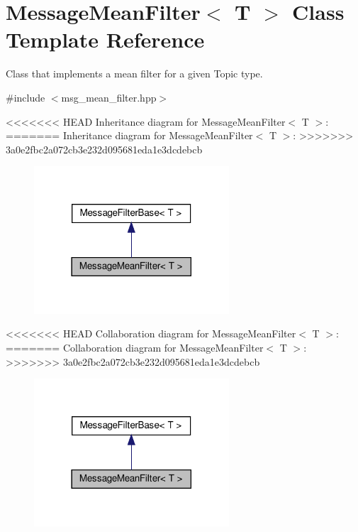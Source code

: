 \hypertarget{classMessageMeanFilter}{}\section{Message\+Mean\+Filter$<$ T $>$ Class Template Reference}
\label{classMessageMeanFilter}


Class that implements a mean filter for a given Topic type.  




{\ttfamily \#include $<$msg\+\_\+mean\+\_\+filter.\+hpp$>$}



<<<<<<< HEAD
Inheritance diagram for Message\+Mean\+Filter$<$ T $>$\+:\nopagebreak
=======
Inheritance diagram for Message\+Mean\+Filter$<$ T $>$\+:
\nopagebreak
>>>>>>> 3a0e2fbc2a072cb3e232d095681eda1e3dcdebcb
\begin{figure}[H]
\begin{center}
\leavevmode
\includegraphics[width=206pt]{dd/d60/classMessageMeanFilter__inherit__graph}
\end{center}
\end{figure}


<<<<<<< HEAD
Collaboration diagram for Message\+Mean\+Filter$<$ T $>$\+:\nopagebreak
=======
Collaboration diagram for Message\+Mean\+Filter$<$ T $>$\+:
\nopagebreak
>>>>>>> 3a0e2fbc2a072cb3e232d095681eda1e3dcdebcb
\begin{figure}[H]
\begin{center}
\leavevmode
\includegraphics[width=206pt]{d2/db9/classMessageMeanFilter__coll__graph}
\end{center}
\end{figure}
